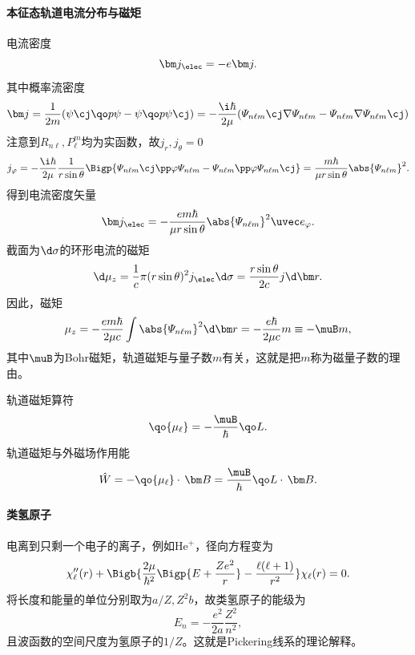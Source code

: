 \paragraph{本征态轨道电流分布与磁矩}
电流密度
\[
	\bm j_\elec=-e\bm j.
\]
其中概率流密度
\[
	\bm j=\frac1{2m}(\psi\cj\qo p\psi-\psi\qo p\psi\cj)=-\frac{\i\hbar}{2\mu}(\varPsi_{n\ell m}\cj\nabla\varPsi_{n\ell m}-\varPsi_{n\ell m}\nabla\varPsi_{n\ell m}\cj)
\]
注意到$R_{n\ell},P_\ell^m$均为实函数，故$j_r,j_\theta=0$
\[
	j_\varphi=-\frac{\i\hbar}{2\mu}\frac1{r\sin\theta}\Bigp{\varPsi_{n\ell m}\cj\pp\varphi\varPsi_{n\ell m}-\varPsi_{n\ell m}\pp\varphi\varPsi_{n\ell m}\cj}=\frac{m\hbar}{\mu r\sin\theta}\abs{\varPsi_{n\ell m}}^2.
\]
得到电流密度矢量
\begin{align}
	\bm j_\elec=-\frac{em\hbar}{\mu r\sin\theta}\abs{\varPsi_{n\ell m}}^2\uvec e_\varphi.
\end{align}
截面为$\d\sigma$的环形电流的磁矩
\[
	\d\mu_z=\frac1c\pi(r\sin\theta)^2j_\elec\d\sigma=\frac{r\sin\theta}{2c}j\d\bm r.
\]
因此，磁矩
\begin{align}
	\mu_z=-\frac{em\hbar}{2\mu c}\int\abs{\varPsi_{n\ell m}}^2\d\bm r=-\frac{e\hbar}{2\mu c}m\equiv-\muB m,
\end{align}
其中$\muB$为Bohr磁矩，轨道磁矩与量子数$m$有关，这就是把$m$称为磁量子数的理由。

轨道磁矩算符
\[
	\qo{\mu_\ell}=-\frac{\muB}\hbar\qo L.
\]
轨道磁矩与外磁场作用能
\[
	\hat W=-\qo{\mu_\ell}\cdot\,\bm B=\frac{\muB}\hbar\qo L\cdot\,\bm B.
\]
\paragraph{类氢原子}电离到只剩一个电子的离子，例如He$^+$，径向方程变为
\[
	\chi''_\ell(r)+\Bigb{\frac{2\mu}{\hbar^2}\Bigp{E+\frac{Ze^2}{r}}-\frac{\ell(\ell+1)}{r^2}}\chi_\ell(r)=0.
\]
将长度和能量的单位分别取为$a/Z,Z^2b$，故类氢原子的能级为
\[
	E_n=-\frac{e^2}{2a}\frac{Z^2}{n^2},
\]
且波函数的空间尺度为氢原子的$1/Z$。这就是Pickering线系的理论解释。

